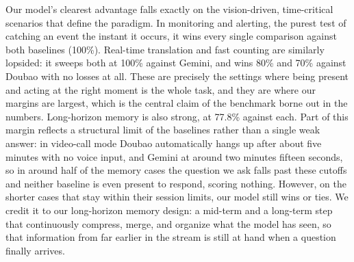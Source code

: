 \documentclass{llmxive}
\begin{document}
Our model's clearest advantage falls exactly on the vision-driven, time-critical scenarios that define the paradigm. In monitoring and alerting, the purest test of catching an event the instant it occurs, it wins every single comparison against both baselines (100\%). Real-time translation and fast counting are similarly lopsided: it sweeps both at 100\% against Gemini, and wins 80\% and 70\% against Doubao with no losses at all. These are precisely the settings where being present and acting at the right moment is the whole task, and they are where our margins are largest, which is the central claim of the benchmark borne out in the numbers. Long-horizon memory is also strong, at 77.8\% against each. Part of this margin reflects a structural limit of the baselines rather than a single weak answer: in video-call mode Doubao automatically hangs up after about five minutes with no voice input, and Gemini at around two minutes fifteen seconds, so in around half of the memory cases the question we ask falls past these cutoffs and neither baseline is even present to respond, scoring nothing. However, on the shorter cases that stay within their session limits, our model still wins or ties. We credit it to our long-horizon memory design: a mid-term and a long-term step that continuously compress, merge, and organize what the model has seen, so that information from far earlier in the stream is still at hand when a question finally arrives.
\end{document}
